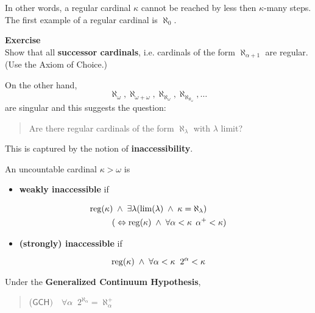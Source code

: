 In other words, a regular cardinal $\kappa$ cannot be reached  by less then $\kappa$-many steps.  The first example of a regular cardinal is $\aleph_0$.

\begin{framed}
\textbf{Exercise}\\
Show that all \textbf{successor cardinals}, i.e. cardinals of the form $\aleph_{\alpha+1}$ are regular. (Use the Axiom of Choice.)
\end{framed}

On the other hand,
\begin{equation*}
\aleph_\omega,  \aleph_{\omega+\omega}, \aleph_{\aleph_{\omega}}, \aleph_{\aleph_{\aleph_\omega}}, \ldots
\end{equation*}
are singular and this suggests the question:

\begin{quote}
Are there regular cardinals of the form $\aleph_\lambda$ with $\lambda$ limit?
\end{quote}

This is captured by the notion of \textbf{inaccessibility}.

\begin{definition}\label{def-inaccessible}An uncountable cardinal $\kappa > \omega$ is

\begin{itemize}
\item \textbf{weakly inaccessible} if
\end{itemize}
\begin{align*}
    \operatorname{reg}(\kappa) \; &  \wedge \;  \exists \lambda (\operatorname{lim}(\lambda) \;  \wedge\;  \kappa = \aleph_\lambda)\\
                        (& \Leftrightarrow \operatorname{reg}(\kappa) \;  \wedge \;  \forall \alpha < \kappa \; \, \alpha^+ < \kappa)
\end{align*}

\begin{itemize}
\item \textbf{(strongly) inaccessible} if
\end{itemize}
\begin{equation*}
\operatorname{reg}(\kappa) \;  \wedge \;  \forall \alpha < \kappa \;\; 2^{\alpha} < \kappa
\end{equation*}
\end{definition}Under the \textbf{Generalized Continuum Hypothesis},

\begin{quote}
($\mathsf{GCH}) \quad \forall \alpha \;\;  2^{\aleph_\alpha} = \aleph_{\alpha}^+$
\end{quote}

